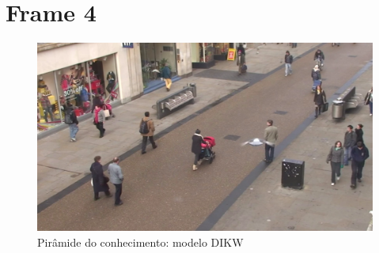 \newpage
\section{Frame 4}



\begin{figure}[h]
	\centering
	\includegraphics[width=0.5\linewidth]{img/vision/frame4.png}
	\caption{Pirâmide do conhecimento: modelo DIKW}
	\label{db}
\end{figure}


